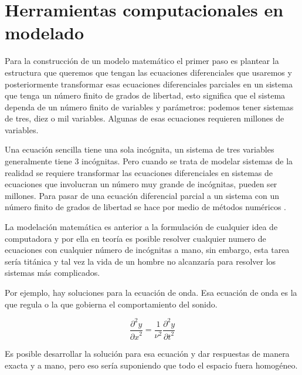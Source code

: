 \documentclass[11pt, letterpaper, spanish]{article}
\begin{document}
{    
    

\newpage

\section{Herramientas computacionales en modelado}

\par{Para la construcción de un modelo matemático el primer paso es plantear la estructura que queremos que tengan las ecuaciones diferenciales que usaremos y posteriormente transformar esas ecuaciones diferenciales parciales en un sistema que tenga un número finito de grados de libertad, esto significa que el sistema dependa de un número finito de variables y parámetros: podemos tener sistemas de tres, diez o mil variables. Algunas de esas ecuaciones requieren millones de variables.}

\par{Una ecuación sencilla tiene una sola incógnita, un sistema de tres variables generalmente tiene 3 incógnitas. Pero cuando se trata de modelar sistemas de la realidad se requiere transformar las ecuaciones diferenciales en sistemas de ecuaciones que involucran un número muy grande de incógnitas, pueden ser millones. Para pasar de una ecuación diferencial parcial a un sistema con un número finito de grados de libertad se hace por medio de métodos numéricos \cite{garfinkel_shevtsov_guo_2017}.}

\par{La modelación matemática es anterior a la formulación de cualquier idea de computadora y por ella en teoría es posible resolver cualquier numero de ecuaciones con cualquier número de incógnitas a mano, sin embargo, esta tarea sería titánica y tal vez la vida de un hombre no alcanzaría para resolver los sistemas más complicados.}

\par{Por ejemplo, hay soluciones para la ecuación de onda. Esa ecuación de onda es la que regula o la que gobierna el comportamiento del sonido.} 

\begin{equation}
    \frac{\partial^2 y}{{\partial x}^2}=\frac{1}{\nu^2} \frac{\partial^2 y}{{\partial t}^2}
\end{equation}

\par{Es posible desarrollar la solución para esa ecuación y dar respuestas de manera exacta y a mano, pero eso sería suponiendo que todo el espacio fuera homogéneo.} 

}
\end{document}
